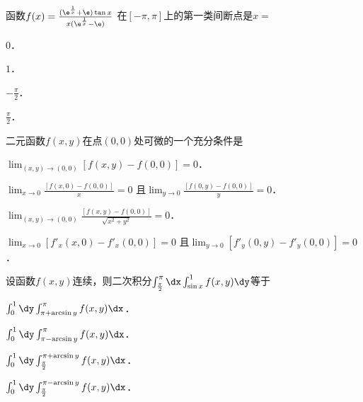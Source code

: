 \documentclass[plain,noanswer,medmath]{../../template/jnuexam}
\begin{document}








\begin{problem}
函数$f(x) = \frac{(\e^{\frac{1}{x}} + \e)\tan x}{x(\e^{\frac{1}{x}} - \e)}$
在$\left[- \pi ,\pi \right]$上的第一类间断点是$x =$\pickout{}
\begin{abcd}
\item $0$．
\item $1$．
\item $- \frac{\pi}{2}$．
\item $\frac{\pi}{2}$．
\end{abcd}
\end{problem}










\begin{problem}
二元函数$f(x,y)$在点$(0,0)$处可微的一个充分条件是\pickout{}
\begin{abcd}
\item $\lim_{(x,y) \to(0,0)} \left[f(x,y) - f(0,0) \right] = 0$．
\item $\lim_{x \to 0} \frac{\left[f(x,0) - f(0,0) \right]}{x} = 0$
      且$\lim_{y \to 0} \frac{\left[f(0,y) - f(0,0) \right]}{y} = 0$．
\item $\lim_{(x,y) \to(0,0)} \frac{\left[f(x,y) - f(0,0) \right]}{\sqrt{x^2 + y^2}} = 0$．
\item $\lim_{x \to 0} \left[f'_x(x,0) - f'_x(0,0) \right] = 0$
      且$\lim_{y \to 0} \left[f'_y(0,y) - f'_y(0,0) \right] = 0$．
\end{abcd}
\end{problem}


\begin{problem}
设函数$f(x,y)$连续，则二次积分$\int_{\frac{\pi}{2}}^{\pi}\dx\int_{\sin x}^1 f(x,y)\dy$等于\pickout{}
\begin{abcd}
\item $\int_0^1 \dy\int_{\pi + \arcsin y}^{\pi}f(x,y)\dx$．
\item $\int_0^1 \dy\int_{\pi - \arcsin y}^{\pi}f(x,y)\dx$．
\item $\int_0^1 \dy\int_{\frac{\pi}{2}}^{\pi + \arcsin y} f(x,y)\dx$．
\item $\int_0^1 \dy\int_{\frac{\pi}{2}}^{\pi - \arcsin y} f(x,y)\dx$．
\end{abcd}
\end{problem}
\end{document}
